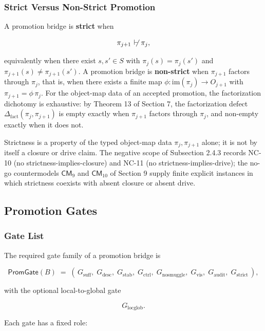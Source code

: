 \documentclass[11pt]{article}
\providecommand{\factor}{\mathrel{\!\vdash\!}}
\theoremstyle{definition}
\begin{document}
\subsubsection{Strict Versus Non-Strict Promotion}

A promotion bridge is \textbf{strict} when

\[
\pi_{j+1}\;\not\factor\;\pi_j,
\]

equivalently when there exist \(s,s'\in S\) with \(\pi_j(s)=\pi_j(s')\) and \(\pi_{j+1}(s)\neq\pi_{j+1}(s')\). A promotion bridge is \textbf{non-strict} when \(\pi_{j+1}\) factors through \(\pi_j\), that is, when there exists a finite map \(\phi:\mathrm{im}(\pi_j)\to O_{j+1}\) with \(\pi_{j+1}=\phi\,\pi_j\). For the object-map data of an accepted promotion, the factorization dichotomy is exhaustive: by Theorem 13 of Section 7, the factorization defect \(\Delta_{\mathrm{fact}}(\pi_j,\pi_{j+1})\) is empty exactly when \(\pi_{j+1}\) factors through \(\pi_j\), and non-empty exactly when it does not.

Strictness is a property of the typed object-map data \(\pi_j,\pi_{j+1}\) alone; it is not by itself a closure or drive claim. The negative scope of Subsection 2.4.3 records NC-10 (no strictness-implies-closure) and NC-11 (no strictness-implies-drive); the no-go countermodels \(\mathsf{CM}_9\) and \(\mathsf{CM}_{10}\) of Section 9 supply finite explicit instances in which strictness coexists with absent closure or absent drive.

\subsection{Promotion Gates}

\subsubsection{Gate List}

The required gate family of a promotion bridge is

\[
\mathsf{PromGate}(B)\;=\;(\,G_{\mathrm{suff}},\;G_{\mathrm{desc}},\;G_{\mathrm{stab}},\;G_{\mathrm{ctrl}},\;G_{\mathrm{nosmuggle}},\;G_{\mathrm{vis}},\;G_{\mathrm{audit}},\;G_{\mathrm{strict}}\,),
\]

with the optional local-to-global gate

\[
G_{\mathrm{locglob}}.
\]

Each gate has a fixed role:
\end{document}
